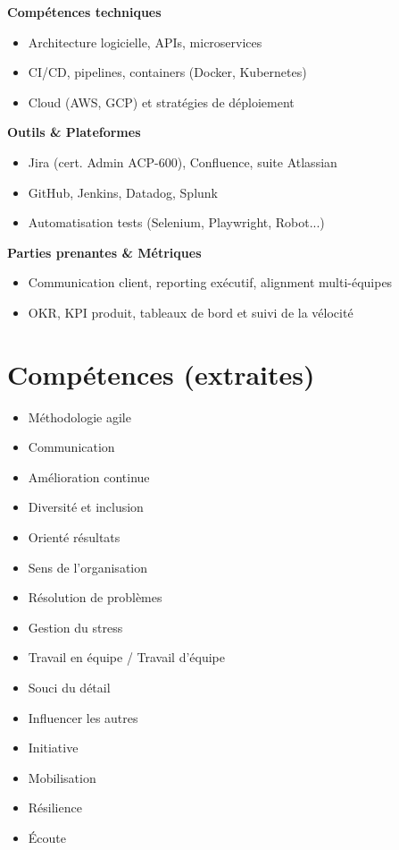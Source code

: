 \documentclass[11pt,a4paper]{article}
\newcommand{\skilltitle}[1]{\normalsize\textcolor{primaryblue}{\textbf{#1}}}
\begin{document}
\begin{minipage}[t]{0.42\textwidth}
\skilltitle{Compétences techniques}
\begin{itemize}[leftmargin=10pt]
    \item Architecture logicielle, APIs, microservices
    \item CI/CD, pipelines, containers (Docker, Kubernetes)
    \item Cloud (AWS, GCP) et stratégies de déploiement
\end{itemize}

\skilltitle{Outils \& Plateformes}
\begin{itemize}[leftmargin=10pt]
    \item Jira (cert. Admin ACP-600), Confluence, suite Atlassian
    \item GitHub, Jenkins, Datadog, Splunk
    \item Automatisation tests (Selenium, Playwright, Robot...)
\end{itemize}

\skilltitle{Parties prenantes \& Métriques}
\begin{itemize}[leftmargin=10pt]
    \item Communication client, reporting exécutif, alignment multi-équipes
    \item OKR, KPI produit, tableaux de bord et suivi de la vélocité
\end{itemize}
\end{minipage}

\vspace{6pt}

\section*{Compétences (extraites)}
\begin{itemize}[leftmargin=12pt]
    \item Méthodologie agile
    \item Communication
    \item Amélioration continue
    \item Diversité et inclusion
    \item Orienté résultats
    \item Sens de l'organisation
    \item Résolution de problèmes
    \item Gestion du stress
    \item Travail en équipe / Travail d’équipe
    \item Souci du détail
    \item Influencer les autres
    \item Initiative
    \item Mobilisation
    \item Résilience
    \item Écoute
\end{itemize}
\end{document}
